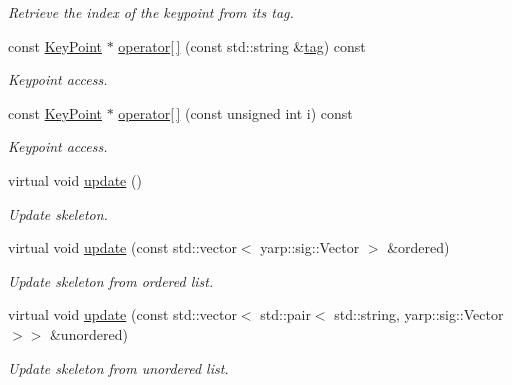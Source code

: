 \begin{DoxyCompactItemize}
\begin{DoxyCompactList}\small\item\em Retrieve the index of the keypoint from its tag. \end{DoxyCompactList}\item 
const \mbox{\hyperlink{classassistive__rehab_1_1KeyPoint}{Key\+Point}} $\ast$ \mbox{\hyperlink{classassistive__rehab_1_1Skeleton_a3ecc7418af653c88e40d41bb379b7271}{operator\mbox{[}$\,$\mbox{]}}} (const std\+::string \&\mbox{\hyperlink{classassistive__rehab_1_1Skeleton_a3d1ce5280300e012826948dc4383c2cb}{tag}}) const
\begin{DoxyCompactList}\small\item\em Keypoint access. \end{DoxyCompactList}\item 
const \mbox{\hyperlink{classassistive__rehab_1_1KeyPoint}{Key\+Point}} $\ast$ \mbox{\hyperlink{classassistive__rehab_1_1Skeleton_a0692ab89f16b0914b9ca9e0d4a07e52c}{operator\mbox{[}$\,$\mbox{]}}} (const unsigned int i) const
\begin{DoxyCompactList}\small\item\em Keypoint access. \end{DoxyCompactList}\item 
\mbox{\label{classassistive__rehab_1_1Skeleton_a1ba2ba229331f7966ff1bce10c776d99}} 
virtual void \mbox{\hyperlink{classassistive__rehab_1_1Skeleton_a1ba2ba229331f7966ff1bce10c776d99}{update}} ()
\begin{DoxyCompactList}\small\item\em Update skeleton. \end{DoxyCompactList}\item 
virtual void \mbox{\hyperlink{classassistive__rehab_1_1Skeleton_adbb387558eac21173b7c82cb43acd603}{update}} (const std\+::vector$<$ yarp\+::sig\+::\+Vector $>$ \&ordered)
\begin{DoxyCompactList}\small\item\em Update skeleton from ordered list. \end{DoxyCompactList}\item 
virtual void \mbox{\hyperlink{classassistive__rehab_1_1Skeleton_ab9642d6621d0a2b189c020f4d7695b14}{update}} (const std\+::vector$<$ std\+::pair$<$ std\+::string, yarp\+::sig\+::\+Vector $>$$>$ \&unordered)
\begin{DoxyCompactList}\small\item\em Update skeleton from unordered list. \end{DoxyCompactList}\item 
$$
\end{DoxyCompactItemize}
